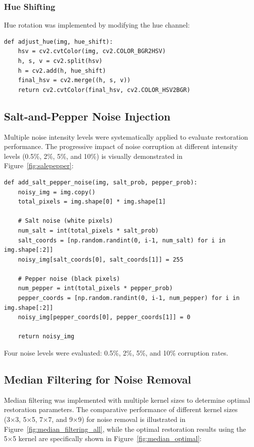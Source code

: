 \documentclass[a4paper, journal]{IEEEtran}
\begin{document}
\subsubsection{Hue Shifting}
Hue rotation was implemented by modifying the hue channel:

\begin{lstlisting}[caption=Hue Adjustment Function]
def adjust_hue(img, hue_shift):
    hsv = cv2.cvtColor(img, cv2.COLOR_BGR2HSV)
    h, s, v = cv2.split(hsv)
    h = cv2.add(h, hue_shift)
    final_hsv = cv2.merge((h, s, v))
    return cv2.cvtColor(final_hsv, cv2.COLOR_HSV2BGR)
\end{lstlisting}

\subsection{Salt-and-Pepper Noise Injection}
Multiple noise intensity levels were systematically applied to evaluate restoration performance. The progressive impact of noise corruption at different intensity levels (0.5\%, 2\%, 5\%, and 10\%) is visually demonstrated in Figure~\ref{fig:salepepper}:

\begin{lstlisting}[caption=Salt-and-Pepper Noise Implementation]
def add_salt_pepper_noise(img, salt_prob, pepper_prob):
    noisy_img = img.copy()
    total_pixels = img.shape[0] * img.shape[1]
    
    # Salt noise (white pixels)
    num_salt = int(total_pixels * salt_prob)
    salt_coords = [np.random.randint(0, i-1, num_salt) for i in img.shape[:2]]
    noisy_img[salt_coords[0], salt_coords[1]] = 255
    
    # Pepper noise (black pixels)
    num_pepper = int(total_pixels * pepper_prob)
    pepper_coords = [np.random.randint(0, i-1, num_pepper) for i in img.shape[:2]]
    noisy_img[pepper_coords[0], pepper_coords[1]] = 0
    
    return noisy_img
\end{lstlisting}

Four noise levels were evaluated: 0.5\%, 2\%, 5\%, and 10\% corruption rates.

\subsection{Median Filtering for Noise Removal}
Median filtering was implemented with multiple kernel sizes to determine optimal restoration parameters. The comparative performance of different kernel sizes (3×3, 5×5, 7×7, and 9×9) for noise removal is illustrated in Figure~\ref{fig:median_filtering_all}, while the optimal restoration results using the 5×5 kernel are specifically shown in Figure~\ref{fig:median_optimal}:
\end{document}
